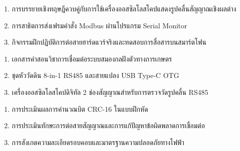 \begin{tcolorbox}[
    enhanced, breakable,
    colback=white, colframe=rbruNavy,
    fonttitle=\bfseries\color{white},
    title={3. วิธีสอนและกิจกรรมการเรียนการสอน},
    arc=1.5mm, boxrule=0.8pt, leftrule=3.5mm
]
\begin{enumerate}
    \item การบรรยายเชิงทฤษฎีควบคู่กับการใช้เครื่องออสซิลโลสโคปแสดงรูปคลื่นสัญญาณเชิงผลต่าง
    \item การสาธิตการส่งเฟรมคำสั่ง Modbus ผ่านโปรแกรม Serial Monitor
    \item กิจกรรมฝึกปฏิบัติการต่อสายฮาร์ดแวร์จริงและทดสอบการสื่อสารบนสมาร์ตโฟน
\end{enumerate}
\end{tcolorbox}

\begin{tcolorbox}[
    enhanced, breakable,
    colback=white, colframe=rbruNavy,
    fonttitle=\bfseries\color{white},
    title={4. สื่อการเรียนการสอน},
    arc=1.5mm, boxrule=0.8pt, leftrule=3.5mm
]
\begin{enumerate}
    \item เอกสารคำสอนวิชาการเชื่อมต่อระบบสมองกลฝังตัวทางการเกษตร
    \item ชุดหัววัดดิน 8-in-1 RS485 และสายแปลง USB Type-C OTG
    \item เครื่องออสซิลโลสโคปดิจิทัล 2 ช่องสัญญาณสำหรับการตรวจวัดรูปคลื่น RS485
\end{enumerate}
\end{tcolorbox}

\begin{tcolorbox}[
    enhanced, breakable,
    colback=white, colframe=rbruNavy,
    fonttitle=\bfseries\color{white},
    title={5. การวัดและประเมินผล},
    arc=1.5mm, boxrule=0.8pt, leftrule=3.5mm
]
\begin{enumerate}
    \item การประเมินผลการคำนวณบิต CRC-16 ในแบบฝึกหัด
    \item การประเมินทักษะการต่อสายสัญญาณและการแก้ปัญหาข้อผิดพลาดการเชื่อมต่อ
    \item การสังเกตความละเอียดรอบคอบและมาตรฐานความปลอดภัยทางไฟฟ้า
\end{enumerate}
\end{tcolorbox}

\clearpage

